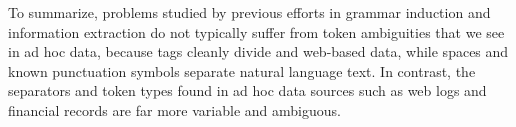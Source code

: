 
To summarize, problems studied by previous efforts 
in grammar induction and information extraction do not 
typically suffer from token ambiguities that 
we see in ad hoc data, because tags cleanly divide \xml{} and web-based data, 
while spaces and known punctuation symbols separate natural language text.
In contrast, the separators and token types found in ad hoc data sources such as
web logs and financial records are far more variable and ambiguous.  


